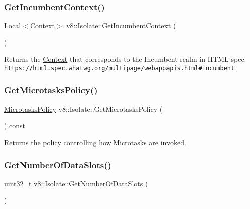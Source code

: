 \subsubsection{\texorpdfstring{Get\+Incumbent\+Context()}{GetIncumbentContext()}}
{\footnotesize\ttfamily \mbox{\hyperlink{classv8_1_1Local}{Local}}$<$\mbox{\hyperlink{classv8_1_1Context}{Context}}$>$ v8\+::\+Isolate\+::\+Get\+Incumbent\+Context (\begin{DoxyParamCaption}{ }\end{DoxyParamCaption})}

Returns the \mbox{\hyperlink{classv8_1_1Context}{Context}} that corresponds to the Incumbent realm in H\+T\+ML spec. \href{https://html.spec.whatwg.org/multipage/webappapis.html#incumbent}{\tt https\+://html.\+spec.\+whatwg.\+org/multipage/webappapis.\+html\#incumbent} \mbox{\label{classv8_1_1Isolate_ab97ba6ea3153a1bfb7a5d942917c2dbe}} 
\subsubsection{\texorpdfstring{Get\+Microtasks\+Policy()}{GetMicrotasksPolicy()}}
{\footnotesize\ttfamily \mbox{\hyperlink{namespacev8_a2f183b102b3d1b7a30a805e8c53c04da}{Microtasks\+Policy}} v8\+::\+Isolate\+::\+Get\+Microtasks\+Policy (\begin{DoxyParamCaption}{ }\end{DoxyParamCaption}) const}

Returns the policy controlling how Microtasks are invoked. \mbox{\label{classv8_1_1Isolate_a7060092fd45588f4085753b3da1b2c82}} 
\subsubsection{\texorpdfstring{Get\+Number\+Of\+Data\+Slots()}{GetNumberOfDataSlots()}}
{\footnotesize\ttfamily uint32\+\_\+t v8\+::\+Isolate\+::\+Get\+Number\+Of\+Data\+Slots (\begin{DoxyParamCaption}{ }\end{DoxyParamCaption})\hspace{0.3cm}{\ttfamily [static]}}

